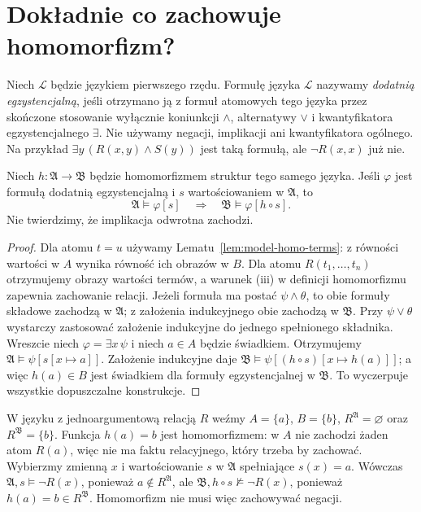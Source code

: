 \section{Dokładnie co zachowuje homomorfizm?}
\begin{definicja}\label{def:model-positive-existential}
Niech $\mathcal L$ będzie językiem pierwszego rzędu.
Formułę języka $\mathcal L$ nazywamy \emph{dodatnią egzystencjalną},
jeśli otrzymano ją z formuł atomowych tego języka przez skończone
stosowanie wyłącznie koniunkcji $\land$, alternatywy $\lor$
i kwantyfikatora egzystencjalnego $\exists$.
Nie używamy negacji, implikacji ani kwantyfikatora ogólnego.
Na przykład $\exists y\,(R(x,y)\land S(y))$ jest taką formułą,
ale $\neg R(x,x)$ już nie.
\end{definicja}
\begin{twierdzenie}\label{thm:model-homo-positive}
Niech $h:\mathfrak A\to\mathfrak B$ będzie homomorfizmem struktur
tego samego języka. Jeśli $\varphi$ jest formułą dodatnią
egzystencjalną i $s$ wartościowaniem w $\mathfrak A$, to
\[
\mathfrak A\models\varphi[s]\quad\Longrightarrow\quad
\mathfrak B\models\varphi[h\circ s].
\]
Nie twierdzimy, że implikacja odwrotna zachodzi.
\end{twierdzenie}
\begin{proof}
Dla atomu $t=u$ używamy Lematu~\ref{lem:model-homo-terms}:
z równości wartości w $A$ wynika równość ich obrazów w $B$.
Dla atomu $R(t_1,\ldots,t_n)$ otrzymujemy obrazy wartości termów,
a warunek (iii) w definicji homomorfizmu zapewnia zachowanie relacji.
Jeżeli formuła ma postać $\psi\land\theta$, to obie formuły składowe
zachodzą w $\mathfrak A$; z założenia indukcyjnego obie zachodzą
w $\mathfrak B$. Przy $\psi\lor\theta$ wystarczy zastosować
założenie indukcyjne do jednego spełnionego składnika.
Wreszcie niech $\varphi=\exists x\,\psi$ i niech $a\in A$
będzie świadkiem. Otrzymujemy
$\mathfrak A\models\psi[s[x\mapsto a]]$.
Założenie indukcyjne daje
$\mathfrak B\models\psi[(h\circ s)[x\mapsto h(a)]]$;
a więc $h(a)\in B$ jest świadkiem dla formuły egzystencjalnej
w $\mathfrak B$. To wyczerpuje wszystkie dopuszczalne konstrukcje.
\end{proof}
\begin{przyklad}
W języku z jednoargumentową relacją $R$ weźmy
$A=\{a\}$, $B=\{b\}$, $R^{\mathfrak A}=\varnothing$
oraz $R^{\mathfrak B}=\{b\}$. Funkcja $h(a)=b$ jest
homomorfizmem: w $A$ nie zachodzi żaden atom $R(a)$,
więc nie ma faktu relacyjnego, który trzeba by zachować.
Wybierzmy zmienną $x$ i wartościowanie $s$ w $\mathfrak A$
spełniające $s(x)=a$. Wówczas
$\mathfrak A,s\models\neg R(x)$, ponieważ $a\notin R^{\mathfrak A}$,
ale $\mathfrak B,h\circ s\not\models\neg R(x)$,
ponieważ $h(a)=b\in R^{\mathfrak B}$.
Homomorfizm nie musi więc zachowywać negacji.
\end{przyklad}
